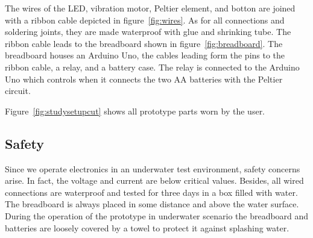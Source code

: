 The wires of the LED, vibration motor, Peltier element, and botton are joined with a ribbon cable depicted in figure~\ref{fig:wires}.
As for all connections and soldering joints, they are made waterproof with glue and shrinking tube.
The ribbon cable leads to the breadboard shown in figure~\ref{fig:breadboard}.
The breadboard houses an Arduino Uno, the cables leading form the pins to the ribbon cable, a relay, and a battery case.
The relay is connected to the Arduino Uno  which controls when it connects the two AA batteries with the Peltier circuit.


%


Figure~\ref{fig:studysetupcut} shows all prototype parts worn by the user.
 


\subsection{Safety}

Since we operate electronics in an underwater test environment, safety concerns arise.
In fact, the voltage and current are below critical values.
Besides, all  wired connections are waterproof and tested for three days in a box filled with water.
The breadboard is always placed in some distance and above the water surface.
During the operation of the prototype in underwater scenario the breadboard and batteries are loosely covered by a towel to protect it against splashing water.

